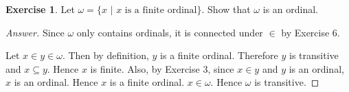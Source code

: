 \documentclass[11pt]{article}
\theoremstyle{definition}
\newtheorem{exer}{Exercise}
\begin{document}
\begin{exer}
Let $\omega = \{ x \, \, | \, \, x \, \, \text{is a finite ordinal} \}$. Show that $\omega$ is an ordinal.
\end{exer}

\begin{proof}[Answer]
Since $\omega$ only contains ordinals, it is connected under $\in$ by Exercise 6.

Let $x \in y \in \omega$. Then by definition, $y$ is a finite ordinal. Therefore $y$ is transitive and $x \subseteq y$. Hence $x$ is finite. Also, by Exercise 3, since $x \in y$ and $y$ is an ordinal, $x$ is an ordinal. Hence $x$ is a finite ordinal. $x \in \omega$. Hence $\omega$ is transitive.

\end{proof}
\end{document}

